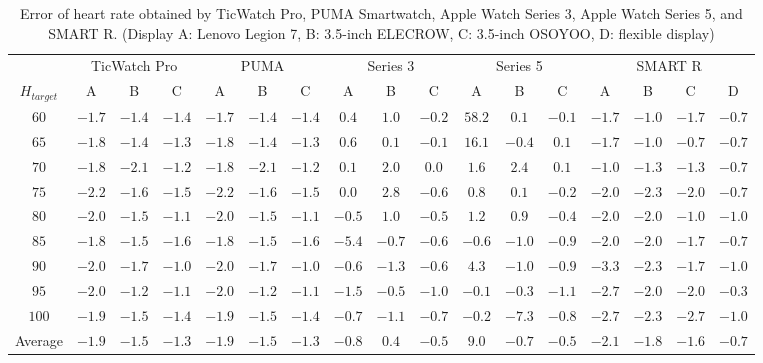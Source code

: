 \documentclass[sigconf]{acmart}
\begin{document}
\begin{table}[!t]
\small
  \centering
  \caption{Error of heart rate obtained by TicWatch Pro, PUMA Smartwatch, Apple Watch Series 3, Apple Watch Series 5, and SMART R. (Display A: Lenovo Legion 7, B: 3.5-inch ELECROW, C: 3.5-inch OSOYOO, D: flexible display) }
  \begin{tabular}{c|ccc|ccc|ccc|ccc|cccc} 
  \toprule
    &\multicolumn{3}{c|}{TicWatch Pro}&\multicolumn{3}{c|}{PUMA}&\multicolumn{3}{c|}{Series 3}&\multicolumn{3}{c|}{Series 5}&\multicolumn{4}{c}{SMART R} \\
    $H_{target}$ & A & B & C & A & B & C & A & B & C & A & B & C & A & B & C & D \\
    \midrule
    $60$ & $-1.7$ & $-1.4$ & $-1.4$ & $-1.7$ & $-1.4$ & $-1.4$ & $0.4$ & $1.0$ & $-0.2$ & $58.2$ & $0.1$ & $-0.1$ & $-1.7$ & $-1.0$ & $-1.7$ & $-0.7$ \\
    $65$ & $-1.8$ & $-1.4$ & $-1.3$ & $-1.8$ & $-1.4$ & $-1.3$ & $0.6$ & $0.1$ & $-0.1$ & $16.1$ & $-0.4$ & $0.1$ & $-1.7$ & $-1.0$ & $-0.7$ & $-0.7$ \\
    $70$ & $-1.8$ & $-2.1$ & $-1.2$ & $-1.8$ & $-2.1$ & $-1.2$ & $0.1$ & $2.0$ & $0.0$ & $1.6$ & $2.4$ & $0.1$ & $-1.0$ & $-1.3$ & $-1.3$ & $-0.7$ \\
    $75$ & $-2.2$ & $-1.6$ & $-1.5$ & $-2.2$ & $-1.6$ & $-1.5$ & $0.0$ & $2.8$ & $-0.6$ & $0.8$ & $0.1$ & $-0.2$ & $-2.0$ & $-2.3$ & $-2.0$ & $-0.7$ \\
    $80$ & $-2.0$ & $-1.5$ & $-1.1$ & $-2.0$ & $-1.5$ & $-1.1$ & $-0.5$ & $1.0$ & $-0.5$ & $1.2$ & $0.9$ & $-0.4$ & $-2.0$ & $-2.0$ & $-1.0$ & $-1.0$ \\
    $85$ & $-1.8$ & $-1.5$ & $-1.6$ & $-1.8$ & $-1.5$ & $-1.6$ & $-5.4$ & $-0.7$ & $-0.6$ & $-0.6$ & $-1.0$ & $-0.9$ & $-2.0$ & $-2.0$ & $-1.7$ & $-0.7$ \\
    $90$ & $-2.0$ & $-1.7$ & $-1.0$ & $-2.0$ & $-1.7$ & $-1.0$ & $-0.6$ & $-1.3$ & $-0.6$ & $4.3$ & $-1.0$ & $-0.9$ & $-3.3$ & $-2.3$ & $-1.7$ & $-1.0$ \\
    $95$ & $-2.0$ & $-1.2$ & $-1.1$ & $-2.0$ & $-1.2$ & $-1.1$ & $-1.5$ & $-0.5$ & $-1.0$ & $-0.1$ & $-0.3$ & $-1.1$ & $-2.7$ & $-2.0$ & $-2.0$ & $-0.3$ \\
    $100$ & $-1.9$ & $-1.5$ & $-1.4$ & $-1.9$ & $-1.5$ & $-1.4$ & $-0.7$ & $-1.1$ & $-0.7$ & $-0.2$ & $-7.3$ & $-0.8$ & $-2.7$ & $-2.3$ & $-2.7$ & $-1.0$ \\
    \midrule
    Average & $-1.9$ & $-1.5$ & $-1.3$ & $-1.9$ & $-1.5$ & $-1.3$ & $-0.8$ & $0.4$ & $-0.5$ & $9.0$ & $-0.7$ & $-0.5$ & $-2.1$ & $-1.8$ & $-1.6$ & $-0.7$ \\
    \bottomrule
  \end{tabular}
  \label{tab:result}
\end{table}
\end{document}

